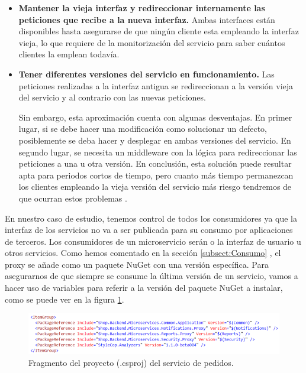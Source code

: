 \documentclass[11pt,spanish,listoffigures]{tfgetsinf}
\begin{document}
\begin{itemize}
\begin{itemize}
\item \textbf{Mantener la vieja interfaz y redireccionar internamente las peticiones que recibe a la nueva interfaz.} Ambas interfaces están disponibles hasta asegurarse de que ningún cliente esta empleando la interfaz vieja, lo que requiere de la monitorización del servicio para saber cuántos clientes la emplean todavía.

\item \textbf{Tener diferentes versiones del servicio en funcionamiento.} Las peticiones realizadas a la interfaz antigua se redireccionan a la versión vieja del servicio y al contrario con las nuevas peticiones.

Sin embargo, esta aproximación cuenta con algunas desventajas. En primer lugar, si se debe hacer una modificación como solucionar un defecto, posiblemente se deba hacer y desplegar en ambas versiones del servicio. En segundo lugar, se necesita un middleware con la lógica para redireccionar las peticiones a una u otra versión. En conclusión, esta solución puede resultar apta para periodos cortos de tiempo, pero cuanto más tiempo permanezcan los clientes empleando la vieja versión del servicio más riesgo tendremos de que ocurran estos problemas \cite{Newman2015a}.

\end{itemize}

\end{itemize}

En nuestro caso de estudio, tenemos control de todos los consumidores ya que la interfaz de los servicios no va a ser publicada para su consumo por aplicaciones de terceros. Los consumidores de un microservicio serán o la interfaz de usuario u otros servicios. Como hemos comentado en la sección \ref{subsect:Consumo} , el proxy se añade como un paquete NuGet con una versión específica. Para asegurarnos de que siempre se consume la última versión de un servicio, vamos a hacer uso de variables para referir a la versión del paquete NuGet a instalar, como se puede ver en la figura \ref{fig:Csproj}.

\begin{figure}[h]
\centering
\includegraphics[scale=0.9]{OrdersNuGets}
\caption{Fragmento del proyecto (.csproj) del servicio de pedidos.}
\label{fig:Csproj}
\end{figure}
\end{document}
